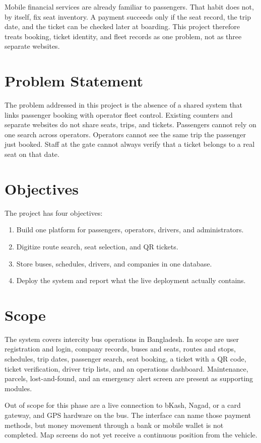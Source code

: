 \documentclass[12pt,a4paper]{report}
\begin{document}
Mobile financial services are already familiar to passengers. That habit does not, by itself, fix seat inventory. A payment succeeds only if the seat record, the trip date, and the ticket can be checked later at boarding. This project therefore treats booking, ticket identity, and fleet records as one problem, not as three separate websites.

\section{Problem Statement}
The problem addressed in this project is the absence of a shared system that links passenger booking with operator fleet control. Existing counters and separate websites do not share seats, trips, and tickets. Passengers cannot rely on one search across operators. Operators cannot see the same trip the passenger just booked. Staff at the gate cannot always verify that a ticket belongs to a real seat on that date.

\section{Objectives}
The project has four objectives:
\begin{enumerate}
  \item Build one platform for passengers, operators, drivers, and administrators.
  \item Digitize route search, seat selection, and QR tickets.
  \item Store buses, schedules, drivers, and companies in one database.
  \item Deploy the system and report what the live deployment actually contains.
\end{enumerate}

\section{Scope}
The system covers intercity bus operations in Bangladesh. In scope are user registration and login, company records, buses and seats, routes and stops, schedules, trip dates, passenger search, seat booking, a ticket with a QR code, ticket verification, driver trip lists, and an operations dashboard. Maintenance, parcels, lost-and-found, and an emergency alert screen are present as supporting modules.

Out of scope for this phase are a live connection to bKash, Nagad, or a card gateway, and GPS hardware on the bus. The interface can name those payment methods, but money movement through a bank or mobile wallet is not completed. Map screens do not yet receive a continuous position from the vehicle.
\end{document}
